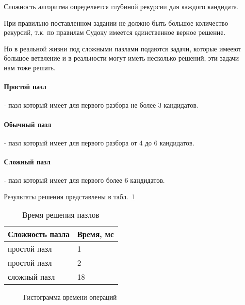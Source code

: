 Сложность алгоритма определяется глубиной рекурсии для каждого кандидата.

При правильно поставленном задании не должно быть большое количество рекурсий, т.к. по правилам Судоку имеется единственное верное решение. 

Но в реальной жизни под сложными пазлами подаются задачи, которые имееют большое ветвление и в реальности могут иметь несколько решений, эти задачи нам тоже решать.

\paragraph{Простой пазл} - пазл который имеет для первого разбора не более 3 кандидатов.

\paragraph{Обычный пазл} - пазл который имеет для первого разбора от 4 до 6 кандидатов.

\paragraph{Сложный пазл} - пазл который имеет для первого более 6 кандидатов.

Результаты решения представлены в табл.~\ref{tab:tres2}

\begin{table}[ht]
  \caption{Время решения пазлов}
  \begin{tabular}{|p{9cm}|p{5.5cm}|}
  \hline
  Сложность пазла & Время, мс \\
  \hline
  простой пазл & 1\\
  \hline
  простой пазл & 2\\
  \hline
  сложный пазл & 18\\
  \hline
  \end{tabular}
  \label{tab:tres2}
\end{table}


\begin{figure}[ht]
 \centering
 \caption{Гистограмма времени операций}
 \label{fig:ChDD1}
\end{figure}

